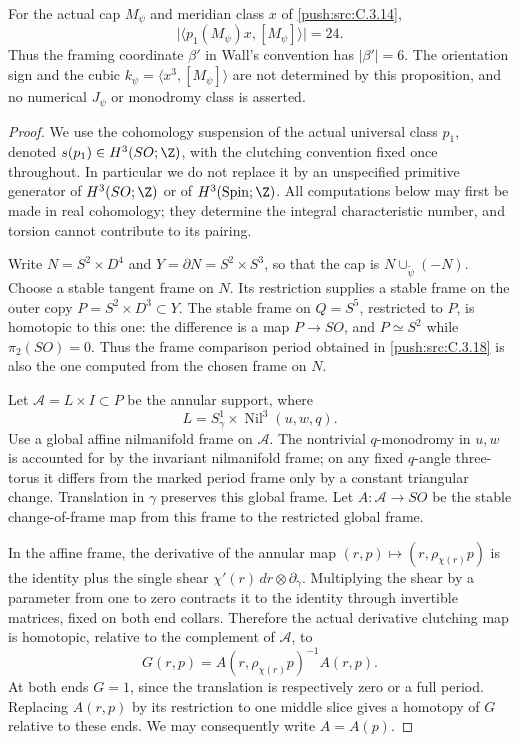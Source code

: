 \begin{proposition}\label{push:src:C.3.19}
For the actual cap $M_\psi$ and meridian class $x$ of \ref{push:src:C.3.14},
\[
 \bigl|\langle p_1(M_\psi)x,[M_\psi]\rangle\bigr|=24.
\]
Thus the framing coordinate $\beta'$ in Wall's convention has
$|\beta'|=6$. The orientation sign and the cubic
$k_\psi=\langle x^3,[M_\psi]\rangle$ are not determined by
this proposition, and no numerical $J_\psi$ or monodromy class
is asserted.
\end{proposition}

\begin{proof}
We use the cohomology suspension of the actual universal class
$p_1$, denoted $s(p_1)\in H^3(SO;\Z)$, with the clutching
convention fixed once throughout. In particular we do not
replace it by an unspecified primitive generator of
$H^3(SO;\Z)$ or of $H^3(\operatorname{Spin};\Z)$.
All computations below may first be made in real cohomology;
they determine the integral characteristic number, and torsion
cannot contribute to its pairing.

Write $N=S^2\times D^4$ and $Y=\partial N=S^2\times S^3$,
so that the cap is $N\cup_{\widetilde\psi}(-N)$. Choose a
stable tangent frame on $N$. Its restriction supplies a stable
frame on the outer copy $P=S^2\times D^3\subset Y$. The
stable frame on $Q=S^5$, restricted to $P$, is homotopic to
this one: the difference is a map $P\to SO$, and
$P\simeq S^2$ while $\pi_2(SO)=0$. Thus the frame comparison
period obtained in \ref{push:src:C.3.18} is also the one computed from the
chosen frame on $N$.

Let $\mathcal A=L\times I\subset P$ be the annular support,
where
\[
 L=S^1_\gamma\times\operatorname{Nil}^3(u,w,q).
\]
Use a global affine nilmanifold frame on $\mathcal A$.
The nontrivial $q$-monodromy in $u,w$ is accounted for by
the invariant nilmanifold frame; on any fixed $q$-angle
three-torus it differs from the marked period frame only
by a constant triangular change. Translation in $\gamma$
preserves this global frame. Let
$A:\mathcal A\to SO$ be the stable change-of-frame map
from this frame to the restricted global frame.

In the affine frame, the derivative of the annular map
$(r,p)\mapsto(r,\rho_{\chi(r)}p)$ is the identity plus
the single shear $\chi'(r)\,dr\otimes\partial_\gamma$.
Multiplying the shear by a parameter from one to zero
contracts it to the identity through invertible matrices,
fixed on both end collars. Therefore the actual derivative
clutching map is homotopic, relative to the complement of
$\mathcal A$, to
\[
 G(r,p)=A(r,\rho_{\chi(r)}p)^{-1}A(r,p).
\]
At both ends $G=1$, since the translation is respectively
zero or a full period. Replacing $A(r,p)$ by its restriction
to one middle slice gives a homotopy of $G$ relative to
these ends. We may consequently write $A=A(p)$.


\end{proof}
